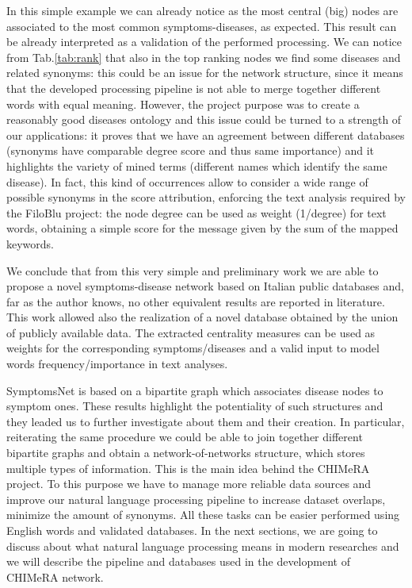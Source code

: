 \documentclass{standalone}
\begin{document}
In this simple example we can already notice as the most central (big) nodes are associated to the most common symptoms-diseases, as expected.
This result can be already interpreted as a validation of the performed processing.
We can notice from Tab.\ref{tab:rank} that also in the top ranking nodes we find some diseases and related synonyms: this could be an issue for the network structure, since it means that the developed processing pipeline is not able to merge together different words with equal meaning.
However, the project purpose was to create a reasonably good diseases ontology and this issue could be turned to a strength of our applications: it proves that we have an agreement between different databases (synonyms have comparable degree score and thus same importance) and it highlights the variety of mined terms (different names which identify the same disease).
In fact, this kind of occurrences allow to consider a wide range of possible synonyms in the score attribution, enforcing the text analysis required by the FiloBlu project: the node degree can be used as weight (1/degree) for text words, obtaining a simple score for the message given by the sum of the mapped keywords.

We conclude that from this very simple and preliminary work we are able to propose a novel symptoms-disease network based on Italian public databases and, far as the author knows, no other equivalent results are reported in literature.
This work allowed also the realization of a novel database obtained by the union of publicly available data.
The extracted centrality measures can be used as weights for the corresponding symptoms/diseases and a valid input to model words frequency/importance in text analyses.

\textsf{SymptomsNet} is based on a bipartite graph which associates disease nodes to symptom ones.
These results highlight the potentiality of such structures and they leaded us to further investigate about them and their creation.
In particular, reiterating the same procedure we could be able to join together different bipartite graphs and obtain a network-of-networks structure, which stores multiple types of information.
This is the main idea behind the \textsf{CHIMeRA} project.
To this purpose we have to manage more reliable data sources and improve our natural language processing pipeline to increase dataset overlaps, minimize the amount of synonyms.
All these tasks can be easier performed using English words and validated databases.
In the next sections, we are going to discuss about what natural language processing means in modern researches and we will describe the pipeline and databases used in the development of \textsf{CHIMeRA} network.
\end{document}
